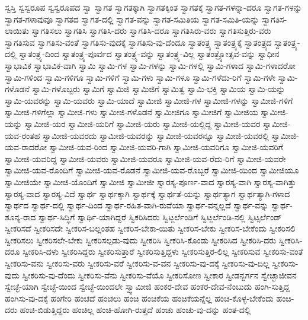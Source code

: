 {ಸ್ವಸ್ತಿ
ಸ್ವಸ್ವರೂಪ
ಸ್ವಸ್ವರೂಪದ
ಸ್ವಾ
ಸ್ವಾಗತ
ಸ್ವಾಗತಕ್ಕಾಗಿ
ಸ್ವಾಗತಕ್ಕಿಂತ
ಸ್ವಾಗತಕ್ಕೆ
ಸ್ವಾಗತ-ಗಳನ್ನಾ-ದರೂ
ಸ್ವಾಗತ-ಗಳನ್ನು
ಸ್ವಾಗತ-ಗಳಾವುವೂ
ಸ್ವಾಗತದ
ಸ್ವಾಗತ-ದಲ್ಲಿ
ಸ್ವಾಗತ-ವನ್ನು
ಸ್ವಾಗತ-ಸಮಿತಿಯ
ಸ್ವಾಗತ-ಸಮಿತಿ-ಯನ್ನು
ಸ್ವಾಗತಿಸ-ಲಾಯಿತು
ಸ್ವಾಗತಿಸಲು
ಸ್ವಾಗತಿಸಿ
ಸ್ವಾಗತಿಸಿ-ದರು
ಸ್ವಾಗತಿಸಿ-ದರೂ
ಸ್ವಾಗತಿಸಿರು-ವರು
ಸ್ವಾಗತಿಸುತ್ತಿರು-ವರು
ಸ್ವಾಗತಿಸುವ
ಸ್ವಾಗತಿಸು-ವಂತೆ
ಸ್ವಾಗತಿಸು-ವುದಕ್ಕೆ
ಸ್ವಾಗತಿಸು-ವು-ದೆಂದೂ
ಸ್ವಾತಂತ್ರ್ಯ
ಸ್ವಾತಂತ್ರ್ಯಕ್ಕೆ
ಸ್ವಾತಂತ್ರ್ಯದ
ಸ್ವಾತಂತ್ರ್ಯ-ದಲ್ಲಿ
ಸ್ವಾತಂತ್ರ್ಯ-ದಿಂದ
ಸ್ವಾತಂತ್ರ್ಯ-ಪೂರ್ವದ
ಸ್ವಾತಂತ್ರ್ಯ-ವನ್ನು
ಸ್ವಾತಂತ್ರ್ಯ-ವಿಲ್ಲ
ಸ್ವಾತಂತ್ರ್ಯೋತ್ಸವ-ವನ್ನು
ಸ್ವಾಧೀನ
ಸ್ವಾಭಾವಿಕ
ಸ್ವಾಭಾವಿಕ-ವಾಗಿ
ಸ್ವಾಮಿ
ಸ್ವಾಮಿ-ಗಳ
ಸ್ವಾಮಿ-ಗಳನ್ನು
ಸ್ವಾಮಿ-ಗಳಲ್ಲಿ
ಸ್ವಾಮಿ-ಗಳಾದ
ಸ್ವಾಮಿ-ಗಳಾದರೋ
ಸ್ವಾಮಿ-ಗಳಿಂದ
ಸ್ವಾಮಿ-ಗಳಿಗೂ
ಸ್ವಾಮಿ-ಗಳಿಗೆ
ಸ್ವಾಮಿ-ಗಳು
ಸ್ವಾಮಿ-ಗಳೂ
ಸ್ವಾಮಿ-ಗಳೆದು-ರಿಗೆ
ಸ್ವಾಮಿ-ಗಳೇ
ಸ್ವಾಮಿ-ಗಳೊಡನೆ
ಸ್ವಾಮಿ-ಗಳೊಬ್ಬರು
ಸ್ವಾಮಿಗೆ
ಸ್ವಾಮಿಜಿ
ಸ್ವಾಮಿಜಿಗೆ
ಸ್ವಾಮಿತ್ವ
ಸ್ವಾಮಿ-ಭಕ್ತಿ
ಸ್ವಾಮಿಯ
ಸ್ವಾಮಿ-ಯನ್ನು
ಸ್ವಾಮಿ-ಯವರನ್ನು
ಸ್ವಾಮಿ-ಯವರು
ಸ್ವಾಮಿ-ಯಾದೆ
ಸ್ವಾಮೀಜಿ
ಸ್ವಾಮೀಜಿ-ಗಳ
ಸ್ವಾಮೀಜಿ-ಗಳನ್ನು
ಸ್ವಾಮೀಜಿ-ಗಳಿಗೆ
ಸ್ವಾಮೀಜಿ-ಗಳಿಗೆಲ್ಲಾ
ಸ್ವಾಮೀಜಿ-ಗಳು
ಸ್ವಾಮೀಜಿ-ಗಳೊಡನೆ
ಸ್ವಾಮೀಜಿಗೂ
ಸ್ವಾಮೀಜಿಗೆ
ಸ್ವಾಮೀಜಿಯ
ಸ್ವಾಮೀಜಿ-ಯನ್ನು
ಸ್ವಾಮೀಜಿ-ಯರ
ಸ್ವಾಮೀಜಿ-ಯರಿಗೆ
ಸ್ವಾಮೀಜಿ-ಯರು
ಸ್ವಾಮೀಜಿ-ಯಲ್ಲಿದ್ದ
ಸ್ವಾಮೀಜಿ-ಯವರ
ಸ್ವಾಮೀಜಿ-ಯವ-ರಂತಹ
ಸ್ವಾಮೀಜಿ-ಯವರದು
ಸ್ವಾಮೀಜಿ-ಯವರನ್ನು
ಸ್ವಾಮೀಜಿ-ಯವರನ್ನೂ
ಸ್ವಾಮೀಜಿ-ಯವರಲ್ಲಿ
ಸ್ವಾಮೀಜಿ-ಯವ-ರಾದರೋ
ಸ್ವಾಮೀಜಿ-ಯವ-ರಿಂದ
ಸ್ವಾಮೀಜಿ-ಯವರಿ-ಗಾಗಿ
ಸ್ವಾಮೀಜಿ-ಯವರಿಗೂ
ಸ್ವಾಮೀಜಿ-ಯವರಿಗೆ
ಸ್ವಾಮೀಜಿ-ಯವರಿದ್ದ
ಸ್ವಾಮೀಜಿ-ಯವರು
ಸ್ವಾಮೀಜಿ-ಯವರೂ
ಸ್ವಾಮೀಜಿ-ಯವ-ರೆದು-ರಿಗೆ
ಸ್ವಾಮೀಜಿ-ಯವರೇ
ಸ್ವಾಮೀಜಿ-ಯವ-ರೊಂದಿಗೆ
ಸ್ವಾಮೀಜಿ-ಯವ-ರೊಡನೆ
ಸ್ವಾಮೀಜಿ-ಯವ-ರೊಬ್ಬರೆ
ಸ್ವಾಮೀಜಿ-ಯಿಂದ
ಸ್ವಾಮೀಜಿಯೂ
ಸ್ವಾಮೀಜಿಯೇ
ಸ್ವಾಮೀಜಿ-ಯೊಂದಿಗೆ
ಸ್ವಾಮೀಜಿ
ಸ್ವಾಮೀಜೀ
ಸ್ವಾರಸ್ಯ-ಪೂರ್ಣ-ವಾದ
ಸ್ವಾರಸ್ಯ-ವಾಗಿ
ಸ್ವಾರಸ್ಯ-ವಾಗಿತ್ತು
ಸ್ವಾರಸ್ಯ-ವಾದ
ಸ್ವಾರಸ್ಯ-ವಿದೆ
ಸ್ವಾರ್ಥ
ಸ್ವಾರ್ಥಕ್ಕಾಗಿ
ಸ್ವಾರ್ಥಕ್ಕೆ
ಸ್ವಾರ್ಥತೆ-ಯನ್ನು
ಸ್ವಾರ್ಥತ್ಯಾಗ
ಸ್ವಾರ್ಥತ್ಯಾಗಿ-ಗಳಾದ
ಸ್ವಾರ್ಥದ
ಸ್ವಾರ್ಥ-ದಲ್ಲಿ
ಸ್ವಾರ್ಥ-ದಿಂದ
ಸ್ವಾರ್ಥ-ರಹಿತ-ವಾಗಿ-ರುವೆಯಾ
ಸ್ವಾರ್ಥ-ವನ್ನಲ್ಲದೆ
ಸ್ವಾರ್ಥ-ವನ್ನು
ಸ್ವಾರ್ಥ-ಶೂನ್ಯ-ರಾದ
ಸ್ವಾರ್ಥ-ಸಿದ್ಧಿಗೆ
ಸ್ವಾರ್ಥಿ-ಯಾಗಿದ್ದರೆ
ಸ್ವಿಕರಿಸಿದರು
ಸ್ವಿಟ್ಜರ್ಲೆಂಡಿಗೆ
ಸ್ವಿಟ್ಜರ್ಲೆಂಡಿ-ನಲ್ಲಿ
ಸ್ವಿಟ್ಸರ್ಲೆಂಡ್
ಸ್ವೀಕರಿಸದೆ
ಸ್ವೀಕರಿಸದೇ
ಸ್ವೀಕರಿಸ-ಬಲ್ಲಂತಹ
ಸ್ವೀಕರಿಸ-ಬೇಕಾ-ಯಿತು
ಸ್ವೀಕರಿಸ-ಬೇಕು
ಸ್ವೀಕರಿಸ-ಬೇಕೆಂದು
ಸ್ವೀಕರಿಸಲಿ
ಸ್ವೀಕರಿಸಲು
ಸ್ವೀಕರಿಸಲೇ-ಬೇಕು
ಸ್ವೀಕರಿಸಲ್ಪಡು-ವುದು
ಸ್ವೀಕರಿಸಿ
ಸ್ವೀಕರಿಸಿ-ಕೊಂಡು
ಸ್ವೀಕರಿಸಿದ
ಸ್ವೀಕರಿಸಿ-ದರು
ಸ್ವೀಕರಿಸಿ-ದರೂ
ಸ್ವೀಕರಿಸಿ-ದಳು
ಸ್ವೀಕರಿಸಿದ್ದರು
ಸ್ವೀಕರಿಸುತ್ತಾರೆ
ಸ್ವೀಕರಿಸುತ್ತಿದ್ದಳು
ಸ್ವೀಕರಿಸುತ್ತಿರ-ಲಿಲ್ಲ
ಸ್ವೀಕರಿಸುವ
ಸ್ವೀಕರಿಸು-ವಂತೆ
ಸ್ವೀಕರಿಸು-ವನು
ಸ್ವೀಕರಿಸು-ವರು
ಸ್ವೀಕರಿಸು-ವರೆ
ಸ್ವೀಕರಿಸು-ವ-ವನ
ಸ್ವೀಕರಿಸು-ವು-ದಕ್ಕೆ
ಸ್ವೀಕರಿಸು-ವು-ದಿಲ್ಲ
ಸ್ವೀಕರಿಸು-ವುದು
ಸ್ವೀಕರಿಸು-ವು-ದೆಂದು
ಸ್ವೀಕರಿಸು-ವೆನು
ಸ್ವೀಕರಿಸು-ವೆಯೊ
ಸ್ವೀಕರಿಸೋಣ
ಸ್ವೀಕಾರ
ಸ್ವೀಡನ್ಬರ್ಗನ
ಸ್ವೇಚ್ಛಾಜೀವನ
ಸ್ವೇಚ್ಛೆ-ಯಾಗಿ
ಸ್ವೇಚ್ಛೆ-ಯಿಂದ
ಸ್ವೇಚ್ಛೆ-ಯಿಂದಲೇ
ಸ್ವ್ವಾಮೀಜಿ
ಹಂಕರ-ದೇವ
ಹಂಕರ-ದೇವ-ನೆಂಬುದು
ಹಂಗಿ-ಸುತ್ತಿದ್ದ
ಹಂಗಿಸು-ವು-ದಕ್ಕೆ
ಹಂಗೇರಿ
ಹಂಚದೆ
ಹಂಚಲು
ಹಂಚಿ
ಹಂಚಿಕೆಯ
ಹಂಚಿಕೆಯನ್ನೆಲ್ಲ
ಹಂಚಿ-ಕೊಳ್ಳ-ಬೇಕೆಂದು
ಹಂಚಿ-ದರು
ಹಂಚಿ-ಬಿಡುತ್ತಿದ್ದರು
ಹಂಚಿಲ್ಲ
ಹಂಚಿ-ಹೋಗಿ-ರುತ್ತದೆ
ಹಂಚು
ಹಂಚು-ವು-ದನ್ನು
ಹಂತ-ದಲ್ಲಿ
}
